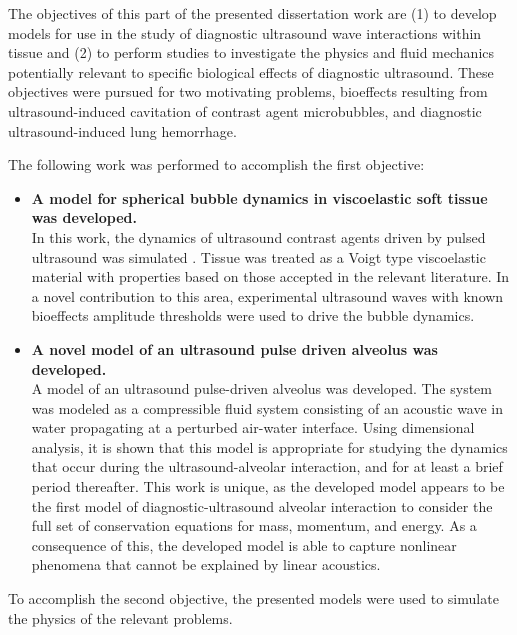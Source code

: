 The objectives of this part of the presented dissertation work are (1)
to develop models for use in the study of diagnostic ultrasound wave
interactions within tissue and (2) to perform studies to investigate
the physics and fluid mechanics potentially relevant to specific
biological effects of diagnostic ultrasound. These objectives were
pursued for two motivating problems, bioeffects resulting from
ultrasound-induced cavitation of contrast agent microbubbles, and
diagnostic ultrasound-induced lung hemorrhage.

The following work was performed to accomplish the first objective:

\begin{itemize}
\item \textbf{A model for spherical bubble dynamics in viscoelastic soft tissue was developed.}\\
  In this work, the dynamics of ultrasound contrast agents driven by
  pulsed ultrasound was simulated \citep{Patterson2012}. Tissue was
  treated as a Voigt type viscoelastic material with properties based
  on those accepted in the relevant literature. In a novel
  contribution to this area, experimental ultrasound waves with known
  bioeffects amplitude thresholds \citep{Miller2008b} were used to
  drive the bubble dynamics.

\item \textbf{A novel model of an ultrasound pulse driven alveolus was developed.}\\
  A model of an ultrasound pulse-driven alveolus was developed. The
  system was modeled as a compressible fluid system consisting of an
  acoustic wave in water propagating at a perturbed air-water
  interface. Using dimensional analysis, it is shown that this model
  is appropriate for studying the dynamics that occur during the
  ultrasound-alveolar interaction, and for at least a brief period
  thereafter. This work is unique, as the developed model appears to
  be the first model of diagnostic-ultrasound alveolar interaction to
  consider the full set of conservation equations for mass, momentum,
  and energy. As a consequence of this, the developed model is able to
  capture nonlinear phenomena that cannot be explained by linear
  acoustics.
\end{itemize}


To accomplish the second objective, the presented models were used to
simulate the physics of the relevant problems. 

